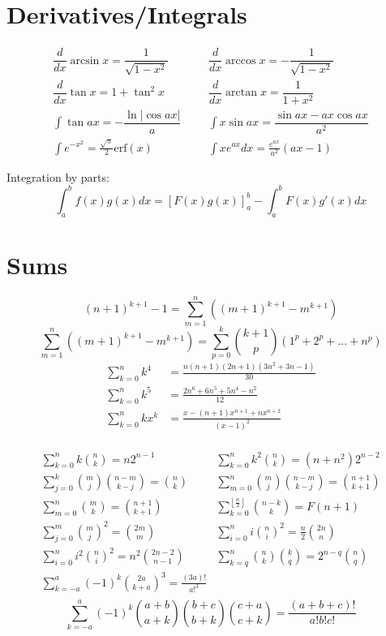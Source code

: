 		\section{Derivatives/Integrals}
		\begin{align*}
			\dfrac{d}{dx}\arcsin x = \dfrac{1}{\sqrt{1-x^2}}  &   &   & \dfrac{d}{dx}\arccos x = -\dfrac{1}{\sqrt{1-x^2}} \\
			\dfrac{d}{dx}\tan x = 1+\tan^2 x                  &   &   & \dfrac{d}{dx}\arctan x = \dfrac{1}{1+x^2}         \\
			\int\tan ax = -\dfrac{\ln|\cos ax|}{a}            &   &   & \int x\sin ax = \dfrac{\sin ax-ax \cos ax}{a^2}   \\
			\int e^{-x^2} = \frac{\sqrt \pi}{2} \text{erf}(x) &   &   & \int xe^{ax}dx = \frac{e^{ax}}{a^2}(ax-1)         
		\end{align*}
														
		Integration by parts:
		\[\int_a^bf(x)g(x)dx = [F(x)g(x)]_a^b-\int_a^bF(x)g'(x)dx\]
														
		\section{Sums}
		\[ (n+1)^{k+1}-1= \sum_{m=1}^{n}((m+1)^{k+1}-m^{k+1})\]
		\[ \sum_{m=1}^{n}((m+1)^{k+1}-m^{k+1})=\sum_{p=0}^{k}\binom{k+1}{p}(1^p+2^p+...+n^p) \]
		\begin{align*}
			\sum_{k=0}^{n} k^4  & = \frac{n(n+1)(2n+1)(3n^2 + 3n - 1)}{30}  \\
			\sum_{k=0}^{n} k^5  & = \frac{2n^6+6n^5+5n^4-n^2}{12}           \\
			\sum_{k=0}^{n} kx^k & = \frac{x-(n+1)x^{n+1}+nx^{n+2}}{(x-1)^2} \\                                           
		\end{align*}
				
		\[\begin{array}{ll}
			\sum_{k=0}^{n} k\binom{n}{k} = n2^{n-1} & \sum_{k=0}^{n} k^2\binom{n}{k} = (n+n^2)2^{n-2} \\                      
			\sum_{j=0}^{k} \binom{m}{j}\binom{n-m}{k-j} = \binom{n}{k} & \sum_{m=0}^{n} \binom{m}{j}\binom{n-m}{k-j} = \binom{n+1}{k+1} \\
			\sum_{m=0}^{n} \binom{m}{k} = \binom{n+1}{k+1} & \sum_{k=0}^{\left \lfloor \frac{n}{2} \right \rfloor} \binom{n-k}{k} = F(n+1) \\
			\sum_{j=0}^{m}\binom{m}{j}^2=\binom{2m}{m} & \sum_{i=0}^{n}i\binom{n}{i}^2=\frac{n}{2}\binom{2n}{n} \\
			\sum_{i=0}^{n}i^2\binom{n}{i}^2=n^2\binom{2n-2}{n-1} & \sum_{k=q}^{n}\binom{n}{k}\binom{k}{q}=2^{n-q}\binom{n}{q} \\
			\sum_{k=-a}^{a}(-1)^k\binom{2a}{k+a}^3=\frac{(3a)!}{a!^3} \\
		\end{array}\]
		\[\sum_{k=-a}^{a}(-1)^k\binom{a+b}{a+k}\binom{b+c}{b+k}\binom{c+a}{c+k}=\frac{(a+b+c)!}{a!b!c!}\]
														
